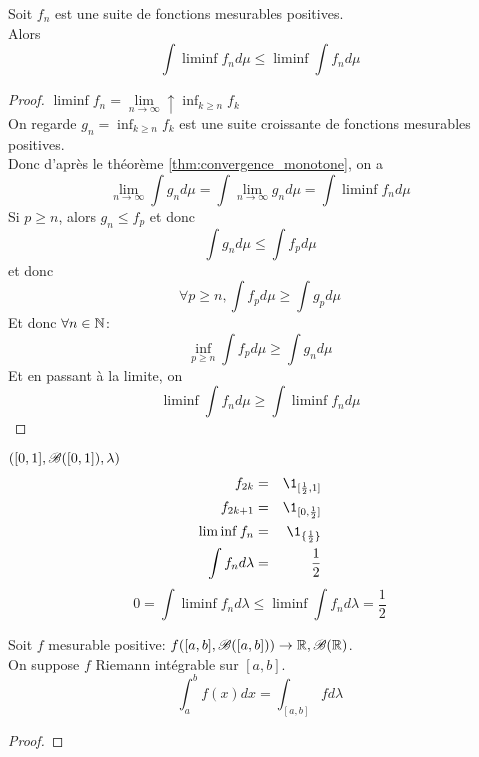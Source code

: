 \begin{theorem}
	Soit $f_n$ est une suite de fonctions mesurables positives.\\
	Alors
	$$ \int \liminf f_n d\mu \leq \liminf \int f_n d\mu $$
\end{theorem}

\begin{proof}
	$\liminf f_n = \lim\limits_{n \to \infty} \uparrow \inf_{k \geq n} f_k$\\
	On regarde $g_n = \inf_{k \geq n} f_k$ est une suite croissante de fonctions mesurables positives.\\
	Donc d'après le théorème \ref{thm:convergence_monotone}, on a
	$$ \lim\limits_{n \to \infty} \int g_n d\mu = \int \lim\limits_{n \to \infty} g_n d\mu = \int \liminf f_n d\mu $$
	Si $p \geq n$, alors $g_n \leq f_p$ et donc
	$$ \int g_n d\mu \leq \int f_p d\mu $$
	et donc
	$$ \forall p \geq n, \int f_p d\mu \geq \int g_p d\mu $$
	Et donc $\forall n \in \mathbb{N}$:
	$$ \inf_{p \geq n} \int f_p d\mu \geq \int g_n d\mu $$
	Et en passant à la limite, on
	$$ \liminf \int f_n d\mu \geq \int \liminf f_n d\mu $$
\end{proof}


\begin{example} $([0,1], \mathscr{B}([0,1]),\lambda)$\\
	\begin{eqnarray*}
		f_{2k} &=& \1_{[\frac{1}{2}, 1]}\\
		f_{2k+1} &=& \1_{[0,\frac{1}{2}]}\\
		\liminf f_n &=& \1_{\{\frac{1}{2}\}}\\
		\int f_n d \lambda &=& \frac{1}{2}
	\end{eqnarray*}
	$$ 0 = \int \liminf f_n d \lambda \leq \liminf \int f_n d \lambda = \frac{1}{2} $$
\end{example}


\begin{theorem}
	Soit $f$ mesurable positive:
	$ f ([a,b], \mathscr{B}([a,b])) \to \mathbb{R}, \mathscr{B}(\mathbb{R})$.\\
	On suppose $f$ Riemann intégrable sur $[a,b]$.\\
	$$ \int_a^b f(x) dx = \int_{[a,b]} f d\lambda $$
\end{theorem}

\begin{proof}
\end{proof}
